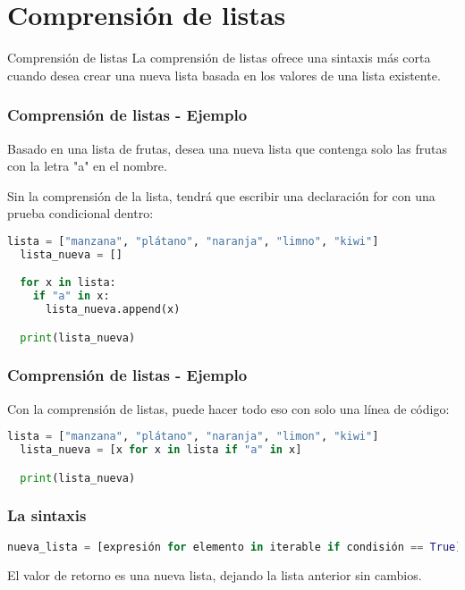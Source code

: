 \section{Comprensión de listas}

\begin{frame}[c]{Comprensión de listas}
  La comprensión de listas ofrece una sintaxis más corta cuando
  desea crear una nueva lista basada en los valores de una lista
  existente.
\end{frame}

\begin{frame}[fragile]
  \frametitle{Comprensión de listas - Ejemplo}

  Basado en una lista de frutas, desea una nueva lista que
  contenga solo las frutas con la letra "a" en el nombre.

  \vspace{\baselineskip}
  Sin la comprensión de la lista, tendrá que escribir una declaración
  \textcolor{codeKeyword}{for} con una prueba condicional dentro: 

  \vspace{\baselineskip}
  \begin{lstlisting}[language=Python]
  lista = ["manzana", "plátano", "naranja", "limno", "kiwi"]
  lista_nueva = []

  for x in lista:
    if "a" in x:
      lista_nueva.append(x)

  print(lista_nueva)
  \end{lstlisting}
\end{frame}

\begin{frame}[fragile]
  \frametitle{Comprensión de listas - Ejemplo}

  Con la comprensión de listas, puede hacer todo eso con
  solo una línea de código:

  \vspace{\baselineskip}
  \begin{lstlisting}[language=Python]
  lista = ["manzana", "plátano", "naranja", "limon", "kiwi"]
  lista_nueva = [x for x in lista if "a" in x]

  print(lista_nueva)
  \end{lstlisting}
\end{frame}

\begin{frame}[fragile]
  \frametitle{La sintaxis}

  \begin{lstlisting}[language=Python]
nueva_lista = [expresión for elemento in iterable if condisión == True]
  \end{lstlisting}

  El valor de retorno es una nueva lista, dejando la lista anterior sin cambios.
\end{frame}

